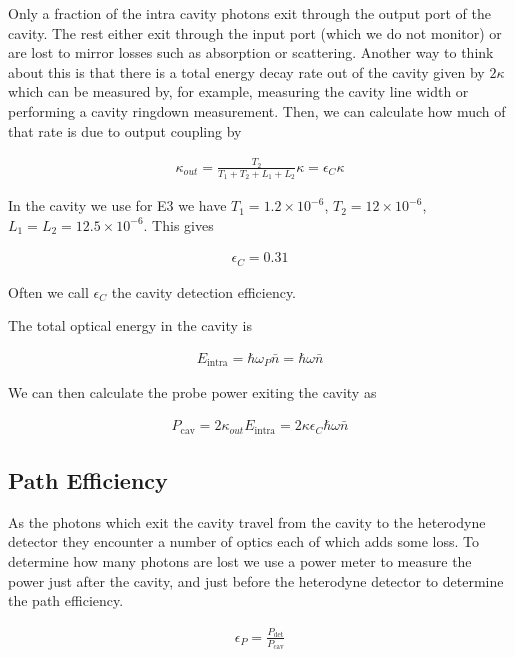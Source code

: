 \documentclass[12pt]{article}
\begin{document}
Only a fraction of the intra cavity photons exit through the output port of the cavity. The rest either exit through the input port (which we do not monitor) or are lost to mirror losses such as absorption or scattering. Another way to think about this is that there is a total energy decay rate out of the cavity given by $2 \kappa$ which can be measured by, for example, measuring the cavity line width or performing a cavity ringdown measurement. Then, we can calculate how much of that rate is due to output coupling by

\begin{align}
\kappa_{out} = \frac{T_2}{T_1+T_2 + L_1 + L_2} \kappa = \epsilon_C \kappa
\end{align}

In the cavity we use for E3 we have $T_1 = 1.2 \times 10^{-6}$, $T_2 = 12 \times 10^{-6}$, $L_1 = L_2 = 12.5 \times 10^{-6}$. This gives 

\begin{align}
\epsilon_C = 0.31
\end{align}

Often we call $\epsilon_C$ the cavity detection efficiency.

The total optical energy in the cavity is

\begin{align}
E_{\text{intra}} = \hbar \omega_P \bar{n} = \hbar \omega \bar{n}
\end{align}

We can then calculate the probe power exiting the cavity as

\begin{align}
P_{\text{cav}} = 2\kappa_{out} E_{\text{intra}} = 2\kappa \epsilon_C \hbar\omega \bar{n}
\end{align}

\subsection{Path Efficiency}

As the photons which exit the cavity travel from the cavity to the heterodyne detector they encounter a number of optics each of which adds some loss. To determine how many photons are lost we use a power meter to measure the power just after the cavity, and just before the heterodyne detector to determine the path efficiency.

\begin{align}
\epsilon_P = \frac{P_{\text{det}}}{P_{\text{cav}}}
\end{align}
\end{document}
